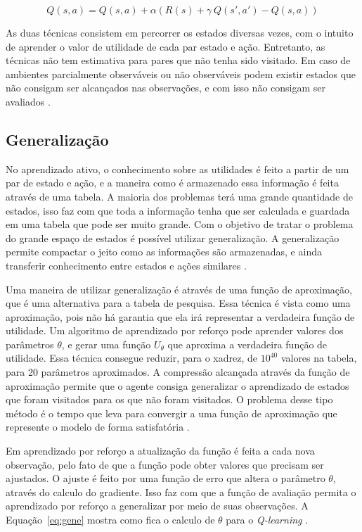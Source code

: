\begin{equation}
\label{eq:sarsa}	
Q(s, a) = Q(s, a) + \alpha (R(s) + \gamma~Q(s', a') - Q(s, a))
\end{equation}


As duas técnicas consistem em percorrer os estados diversas vezes, com o intuito de aprender o valor de utilidade de cada par estado e ação. Entretanto, as técnicas não tem estimativa para pares que não tenha sido visitado. Em caso de ambientes parcialmente observáveis ou não observáveis podem existir estados que não consigam ser alcançados nas observações, e com isso não consigam ser avaliados \cite{Mitchell1997ML}.   


\subsection{Generalização} 
 
No aprendizado ativo, o conhecimento sobre as utilidades é feito a partir de um par de estado e ação, e a maneira como é armazenado essa informação é feita através de uma tabela. A maioria dos problemas terá uma grande quantidade de estados, isso faz com que toda a informação tenha que ser calculada e guardada em uma tabela que pode ser muito grande. Com o objetivo de tratar o problema do grande espaço de estados é possível utilizar generalização. A generalização permite compactar o jeito como as informações são armazenadas, e ainda transferir conhecimento entre estados e ações similares \cite{Mitchell1997ML, kaelbling1996reinforcement}.

Uma maneira de utilizar generalização é através de uma função de aproximação, que é uma alternativa para a tabela de pesquisa. Essa técnica é vista como uma aproximação, pois não há garantia que ela irá representar a verdadeira função de utilidade. Um algoritmo de aprendizado por reforço pode aprender valores dos parâmetros $\theta$, e gerar uma função $U_{\theta}$ que aproxima a verdadeira função de utilidade. Essa técnica consegue reduzir, para o xadrez, de $10^{40}$ valores na tabela, para 20 parâmetros aproximados. A compressão alcançada através da função de aproximação permite que o agente consiga generalizar o aprendizado de estados que foram visitados para os que não foram visitados. O problema desse tipo método é o tempo que leva para convergir a uma função de aproximação que represente o modelo de forma satisfatória \cite{intelligence2003modern}.

Em aprendizado por reforço a atualização da função é feita a cada nova observação, pelo fato de que a função pode obter valores que precisam ser ajustados. O ajuste é feito por uma função de erro que altera o parâmetro $\theta$, através do calculo do gradiente. Isso faz com que a função de avaliação permita o aprendizado por reforço a generalizar por meio de suas observações. A Equação~\ref{eq:gene} mostra como fica o calculo de $\theta$ para o \textit{Q-learning} \cite{intelligence2003modern}.

